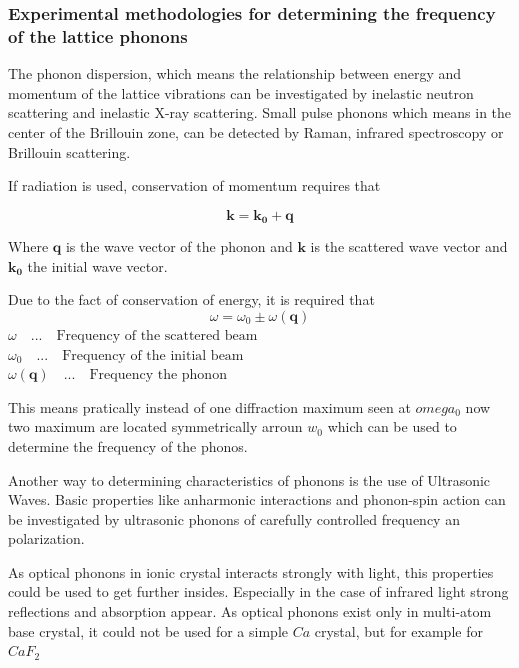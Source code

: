 \subsubsection*{Experimental methodologies for determining the frequency of the lattice phonons}

The phonon dispersion, which means the relationship between energy and momentum of the 
lattice vibrations can be investigated by inelastic neutron scattering and inelastic 
X-ray scattering. Small pulse phonons which means in the center of the Brillouin zone, 
can be detected by Raman, infrared spectroscopy or Brillouin scattering.

If radiation is used, conservation of momentum requires that

$$\mathbf{k} = \mathbf{k_0} + \mathbf{q}$$

Where $\mathbf{q}$ is the wave vector of the phonon and $\mathbf{k}$
is the scattered wave vector and $\mathbf{k_0}$ the initial wave vector.

Due to the fact of conservation of energy, it is required that
$$\omega = \omega_0 \pm \omega(\mathbf{q})$$
$\omega  \quad ... \quad \textrm{Frequency of the scattered beam}$\\
$\omega_0  \quad ... \quad \textrm{Frequency of the initial beam}$\\
$\omega(\mathbf{q})  \quad ... \quad \textrm{Frequency the phonon}$

This means pratically instead of one diffraction maximum seen at $omega_0$ 
now two maximum are located symmetrically arroun $w_0$ which can be used 
to determine the frequency of the phonos.

Another way to determining characteristics of phonons is the use of Ultrasonic Waves.
Basic properties like anharmonic interactions and phonon-spin action can be investigated
by ultrasonic phonons of carefully controlled frequency an polarization.

As optical phonons in ionic crystal interacts strongly with light, this properties
could be used to get further insides. Especially in the case of infrared light
strong reflections and absorption appear. As optical phonons exist only in multi-atom
base crystal, it could not be used for a simple $Ca$ crystal, but for example for
$CaF_2$